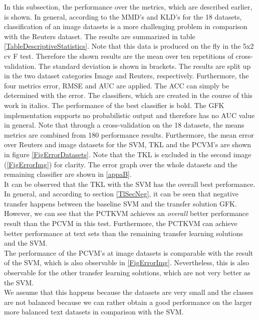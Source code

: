 In this subsection, the performance over the metrics, which are described earlier, is shown.
In general, according to the \acs{MMD}'s and \acs{KLD}'s for the 18 datasets, classification of an image datasets is a more challenging problem in comparison with the Reuters dataset.
The results are summarized in table \ref{TableDescriptiveStatistics}. 
Note that this data is produced on the fly in the 5x2 cv F test. Therefore the shown results are the mean over ten repetitions of cross-validation.
The standard deviation is shown in brackets. 
The results are split up in the two dataset categories Image and Reuters, respectively.
Furthermore, the four metrics error, \acs{RMSE} and \acs{AUC} are applied.
The \ac{ACC} can simply be determined with the error.
The classifiers, which are created in the course of this work in italics.
The performance of the best classifier is bold.
The \acs{GFK} implementation supports no probabilistic output and therefore has no \acs{AUC} value in general.
Note that through a cross-validation on the 18 datasets, the means metrics are combined from 180 performance results.
Furthermore, the mean error over Reuters and image datasets for the \acs{SVM}, \acs{TKL} and the \acs{PCVM}'s are shown in figure \ref{FigErrorDatasets}.
Note that the \acs{TKL} is excluded in the second image (\ref{FigErrorImg}) for clarity.
The error graph over the whole datasets and the remaining classifier are shown in \ref{appaB}.\\
It can be observed that the \acs{TKL} with the \acs{SVM} has the overall best performance. 
In general, and according to section \ref{TlSecNeg}, it can be seen that negative transfer happens between the baseline \acs{SVM} and the transfer solution \acs{GFK}.
However, we can see that the \acs{PCTKVM}  achieves an \textit{overall} better performance result than the \acs{PCVM} in this test.
Furthermore, the \acs{PCTKVM} can achieve better performance at text sets than the remaining transfer learning solutions and the \acs{SVM}.\\
The performance of the \acs{PCVM}'s at image datasets is comparable with the result of the \acs{SVM}, which is also observable in \ref{FigErrorImg}.
Nevertheless, this is also observable for the other transfer learning solutions, which are not very better as the \acs{SVM}.\\
We assume that this happens because the datasets are very small and the classes are not balanced because we can rather obtain a good performance on the larger more balanced text datasets in comparison with the \acs{SVM}.
